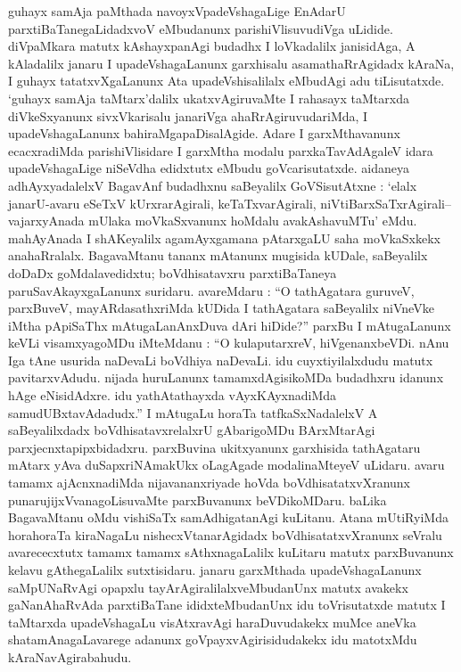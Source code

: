 guhayx samAja paMthada navoyxVpadeVshagaLige EnAdarU parxtiBaTanegaLidadxvoV eMbu\-danunx parishiVlisuvudiVga uLidide. diVpaMkara matutx kAshayxpanAgi budadhx I loVkadalilx janisidAga, A kAladalilx janaru I upadeVshagaLanunx garxhisalu asamathaRrAgidadx kAraNa, I guhayx tatatxvXgaLanunx Ata upadeVshisalilalx eMbudAgi adu tiLisutatxde. `guhayx samAja taMtarx'dalilx ukatxvAgiruvaMte I rahasayx taMtarxda diVkeSxyanunx sivxVkarisalu janariVga ahaRrAgiruvudariMda, I upadeVshagaLanunx bahiraMgapaDisalAgide. Adare I garxMthavanunx ecacxradiMda parishiVlisidare I garxMtha modalu parxkaTavAdAgaleV idara upadeVshagaLige niSeVdha edidxtutx eMbudu goVcarisutatxde. aidaneya adhAyxyadalelxV BagavAnf budadhxnu saBeyalilx GoVSisutAtxne : `elalx janarU-avaru eSeTxV kUrxrarAgirali, keTaTxvarAgirali, niVtiBarxSaTxrAgirali--vajarxyAnada mUlaka moVkaSxvanunx hoMdalu avakAshavuMTu' eMdu. mahAyAnada I shAKeyalilx agamAyxgamana pAtarxgaLU saha moVkaSxkekx anahaRralalx. BagavaMtanu tananx mAtanunx mugisida kUDale, saBeyalilx doDaDx goMdalavedidxtu; boVdhisatavxru parxtiBaTaneya paruSavAkayxgaLanunx suridaru. avareMdaru : ``O tathAgatara guruveV, parxBuveV, mayARdasathxriMda kUDida I tathAgatara saBeyalilx niVneVke iMtha pApiSaThx mAtugaLanAnxDuva dAri hiDide?'' parxBu I mAtugaLanunx keVLi visamxyagoMDu iMteMdanu : ``O kulaputarxreV, hiVgenanxbeVDi. nAnu Iga tAne usurida naDevaLi boVdhiya naDevaLi. idu cuyxtiyilalxdudu matutx pavitarxvAdudu. nijada huruLanunx tamamxdAgisikoMDa budadhxru idanunx hAge eNisidAdxre. idu yathAtathayxda vAyxKAyxnadiMda samudUBxtavAdadudx.'' I mAtugaLu horaTa tatfkaSxNadalelxV A saBeyalilxdadx boVdhisatavxrelalxrU gAbarigoMDu BArxMtarAgi parxjecnxtapipxbidadxru. parxBuvina ukitxyanunx garxhisida tathAgataru mAtarx yAva duSapxriNAmakUkx oLagAgade modalinaMteyeV uLidaru. avaru tamamx ajAcnxnadiMda nijavananxriyade hoVda boVdhisatatxvXranunx punarujijxVvanagoLisuvaMte parxBuvanunx beVDikoMDaru. baLika BagavaMtanu oMdu vishiSaTx samAdhigatanAgi kuLitanu. Atana mUtiRyiMda horahoraTa kiraNagaLu nishecxVtanarAgidadx boVdhisatatxvXranunx seVralu avarececxtutx tamamx tamamx sAthxnagaLalilx kuLitaru matutx parxBuvanunx kelavu gAthegaLalilx sutxtisidaru. janaru garxMthada upadeVshagaLanunx saMpUNaRvAgi opapxlu tayArAgiralilalxveMbudanUnx matutx avakekx gaNanAhaRvAda parxtiBaTane ididxteMbudanUnx idu toVrisutatxde matutx I taMtarxda upadeVshagaLu visAtxravAgi haraDuvudakekx muMce aneVka shatamAnagaLavarege adanunx goVpayxvAgirisidudakekx idu matotxMdu kAraNavAgirabahudu.


